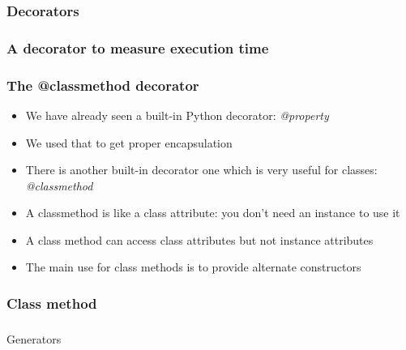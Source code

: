 \documentclass[9pt]{beamer}
\begin{document}
\begin{frame}
  \frametitle{Decorators}
  
\end{frame}


\begin{frame}
  \frametitle{A decorator to measure execution time}
  
\end{frame}


\begin{frame}
  \frametitle{The @classmethod decorator}
  \begin{itemize}
    \item We have already seen a built-in Python decorator: \emph{@property}
    \item We used that to get proper encapsulation
    \item There is another built-in decorator one which is very useful for classes: \alert{\emph{@classmethod}}
    \item A classmethod is like a class attribute: you don't need an instance to
          use it
    \item A class method can access class attributes but not instance attributes
    \item The main use for class methods is to provide \alert{alternate constructors}
  \end{itemize}
  
\end{frame}


\begin{frame}
  \frametitle{Class method}
  
\end{frame}


\begin{frame}
  \frametitle{}
  \centering \Large Generators
\end{frame}
\end{document}
